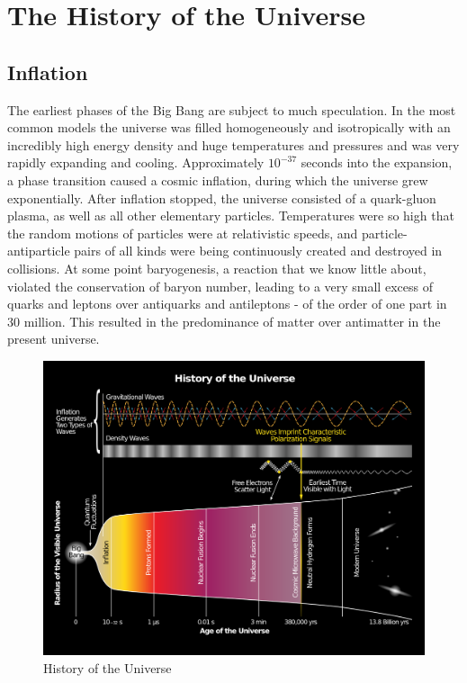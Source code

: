 \documentclass{tufte-handout}
\newcommand{\parnum}{\bfseries\arabic{parcount}}
\newcounter{parcount}
\newcommand\p{%
    \stepcounter{parcount}%
    \leavevmode\marginpar[\hfill\parnum]{\parnum}%
}
\begin{document}
\section{The History of the Universe}
\subsection{Inflation}
\p The earliest phases of the Big Bang are subject to much speculation. In the most common models the universe was filled homogeneously and isotropically with an incredibly high energy density and huge temperatures and pressures and was very rapidly expanding and cooling. Approximately $10^{-37}$ seconds into the expansion, a phase transition caused a cosmic inflation, during which the universe grew exponentially. After inflation stopped, the universe consisted of a quark-gluon plasma, as well as all other elementary particles. Temperatures were so high that the random motions of particles were at relativistic speeds, and particle-antiparticle
pairs of all kinds were being continuously created and destroyed in collisions. At some point baryogenesis, a reaction that we know little about, violated the conservation of baryon number, leading to a very small excess of quarks and leptons over antiquarks and antileptons - of the order of one part in 30 million. This resulted in the predominance of matter over antimatter in the present universe.
\begin{figure}
\includegraphics[]{History_of_the_Universe_svg.png}
\caption{History of the Universe}
\end{figure} 
\end{document}
